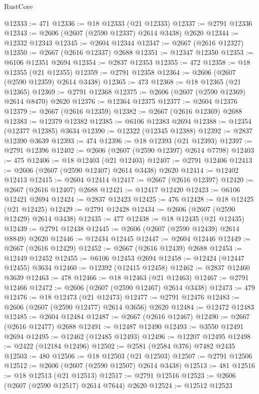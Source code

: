 \begin{lexlean}{RustCore}
\begin{coremodule}
@12333 := 471
@12336 := @18 @12333 (@21 @12333)
@12337 := @2791 @12336
@12343 := @2606 (@2607 (@2590 @12337) @2614 @3438) @2620
@12344 := @12332 @12343
@12345 := @2604 @12344
@12347 := @2667 (@2616 @12327)
@12350 := @2667 (@2616 @12337) @2688
@12351 := @12347 @12350
@12353 := @6106 @12351 @2694
@12354 := @2837 @12353
@12355 := 472
@12358 := @18 @12355 (@21 @12355)
@12359 := @2791 @12358
@12364 := @2606 (@2607 (@2590 @12359) @2614 @3438)
@12365 := 473
@12368 := @18 @12365 (@21 @12365)
@12369 := @2791 @12368
@12375 := @2606 (@2607 (@2590 @12369) @2614 @8470) @2620
@12376 := @12364 @12375
@12377 := @2604 @12376
@12379 := @2667 (@2616 @12359)
@12382 := @2667 (@2616 @12369) @2688
@12383 := @12379 @12382
@12385 := @6106 @12383 @2694
@12388 := @12354 (@12377 @12385) @3634
@12390 := @12322 (@12345 @12388)
@12392 := @2837 @12390 @3639
@12393 := 474
@12396 := @18 @12393 (@21 @12393)
@12397 := @2791 @12396
@12402 := @2606 (@2607 (@2590 @12397) @2614 @7798)
@12403 := 475
@12406 := @18 @12403 (@21 @12403)
@12407 := @2791 @12406
@12413 := @2606 (@2607 (@2590 @12407) @2614 @3438) @2620
@12414 := @12402 @12413
@12415 := @2604 @12414
@12417 := @2667 (@2616 @12397)
@12420 := @2667 (@2616 @12407) @2688
@12421 := @12417 @12420
@12423 := @6106 @12421 @2694
@12424 := @2837 @12423
@12425 := 476
@12428 := @18 @12425 (@21 @12425)
@12429 := @2791 @12428
@12434 := @2606 (@2607 (@2590 @12429) @2614 @3438)
@12435 := 477
@12438 := @18 @12435 (@21 @12435)
@12439 := @2791 @12438
@12445 := @2606 (@2607 (@2590 @12439) @2614 @8849) @2620
@12446 := @12434 @12445
@12447 := @2604 @12446
@12449 := @2667 (@2616 @12429)
@12452 := @2667 (@2616 @12439) @2688
@12453 := @12449 @12452
@12455 := @6106 @12453 @2694
@12458 := @12424 (@12447 @12455) @3634
@12460 := @12392 (@12415 @12458)
@12462 := @2837 @12460 @3639
@12463 := 478
@12466 := @18 @12463 (@21 @12463)
@12467 := @2791 @12466
@12472 := @2606 (@2607 (@2590 @12467) @2614 @3438)
@12473 := 479
@12476 := @18 @12473 (@21 @12473)
@12477 := @2791 @12476
@12483 := @2606 (@2607 (@2590 @12477) @2614 @3656) @2620
@12484 := @12472 @12483
@12485 := @2604 @12484
@12487 := @2667 (@2616 @12467)
@12490 := @2667 (@2616 @12477) @2688
@12491 := @12487 @12490
@12493 := @3550 @12491 @2694
@12495 := @12462 (@12485 @12493)
@12496 := @12207 @12495
@12498 := @2422 (@12184 @12496)
@12502 := @2581 (@2584 @376) @7482 @2435
@12503 := 480
@12506 := @18 @12503 (@21 @12503)
@12507 := @2791 @12506
@12512 := @2606 (@2607 (@2590 @12507) @2614 @3438)
@12513 := 481
@12516 := @18 @12513 (@21 @12513)
@12517 := @2791 @12516
@12523 := @2606 (@2607 (@2590 @12517) @2614 @7644) @2620
@12524 := @12512 @12523

\end{coremodule}
\end{lexlean}
